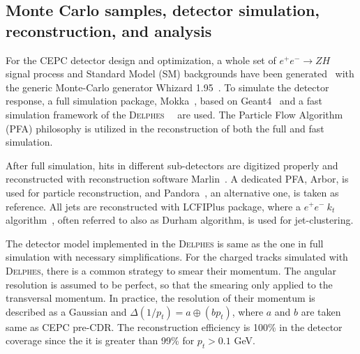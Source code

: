 \documentclass[a4paper,10pt,twoside]{cpc-hepnp}
\begin{document}
\begin{multicols}{2}
\section{Monte Carlo samples, detector simulation, reconstruction, and analysis\label{sec:simulation}}

For the CEPC detector design and optimization,
a whole set of $e^+e^- \to ZH$ signal process and Standard Model (SM) backgrounds have been generated~\cite{ref:cepccpc}
with the generic Monte-Carlo generator {\sf Whizard 1.95}{~\cite{ref:whizard}}.
To simulate the detector response, a full simulation package, Mokka{~\cite{ref:mokka}},
based on Geant4{~\cite{ref:geant4}} and a fast simulation framework of the {\textsc{Delphes}~}{~\cite{ref:delphes}} are used.  The Particle Flow Algorithm (PFA) philosophy is utilized in the reconstruction of both the full and fast simulation.


After full simulation,  hits in different sub-detectors are digitized properly
and reconstructed with reconstruction software  Marlin{~\cite{ref:marlin}}.
A dedicated PFA, Arbor\cite{ref:arbor},  is used for particle reconstruction, and Pandora{~\cite{ref:pandora}}, an alternative one,
is taken as reference. All jets are reconstructed with LCFIPlus package\cite{ref:lcfiplus},
where a $e^+e^-~k_t$ algorithm{~\cite{ref:eekt}},  often referred to also as {\sf Durham} algorithm,  is used for jet-clustering.

The detector model implemented in the {\textsc{Delphes}} is same as the one in full simulation with necessary simplifications.
For the charged tracks simulated with {\textsc{Delphes}}, there is a common strategy to smear their momentum.
The angular resolution is assumed to be perfect, so that the smearing only applied to the transversal momentum.
In practice, the resolution of their momentum is described as a Gaussian and  $\Delta(1/p_t)=a \oplus (b p_t) $,
where $a$ and $b$ are taken same as CEPC pre-CDR.
The reconstruction efficiency is 100\% in the detector coverage since the it is greater than 99\% for $p_t>0.1$ GeV.



\end{multicols}
\end{document}

